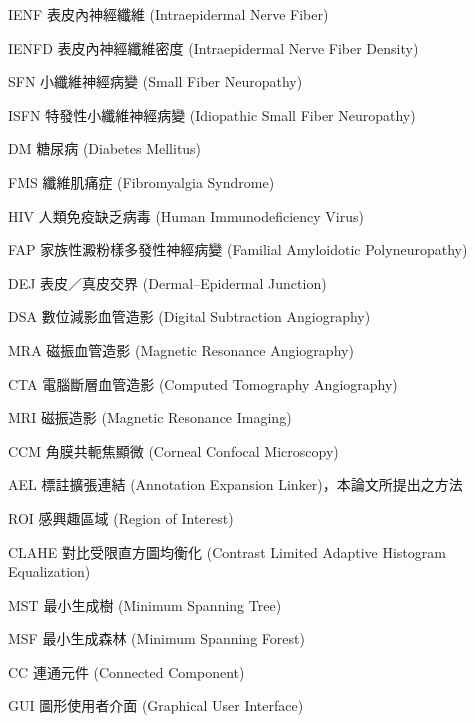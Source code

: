 
\begin{abbreviations}[2.5cm]

\item[IENF]{
  表皮內神經纖維 (Intraepidermal Nerve Fiber)
}

\item[IENFD]{
  表皮內神經纖維密度 (Intraepidermal Nerve Fiber Density)
}

\item[SFN]{
  小纖維神經病變 (Small Fiber Neuropathy)
}

\item[ISFN]{
  特發性小纖維神經病變 (Idiopathic Small Fiber Neuropathy)
}

\item[DM]{
  糖尿病 (Diabetes Mellitus)
}

\item[FMS]{
  纖維肌痛症 (Fibromyalgia Syndrome)
}

\item[HIV]{
  人類免疫缺乏病毒 (Human Immunodeficiency Virus)
}

\item[FAP]{
  家族性澱粉樣多發性神經病變 (Familial Amyloidotic Polyneuropathy)
}

\item[DEJ]{
  表皮／真皮交界 (Dermal--Epidermal Junction)
}

\item[DSA]{
  數位減影血管造影 (Digital Subtraction Angiography)
}

\item[MRA]{
  磁振血管造影 (Magnetic Resonance Angiography)
}

\item[CTA]{
  電腦斷層血管造影 (Computed Tomography Angiography)
}

\item[MRI]{
  磁振造影 (Magnetic Resonance Imaging)
}

\item[CCM]{
  角膜共軛焦顯微 (Corneal Confocal Microscopy)
}

\item[AEL]{
  標註擴張連結 (Annotation Expansion Linker)，本論文所提出之方法
}

\item[ROI]{
  感興趣區域 (Region of Interest)
}

\item[CLAHE]{
  對比受限直方圖均衡化 (Contrast Limited Adaptive Histogram Equalization)
}

\item[MST]{
  最小生成樹 (Minimum Spanning Tree)
}

\item[MSF]{
  最小生成森林 (Minimum Spanning Forest)
}

\item[CC]{
  連通元件 (Connected Component)
}

\item[GUI]{
  圖形使用者介面 (Graphical User Interface)
}

\end{abbreviations}
